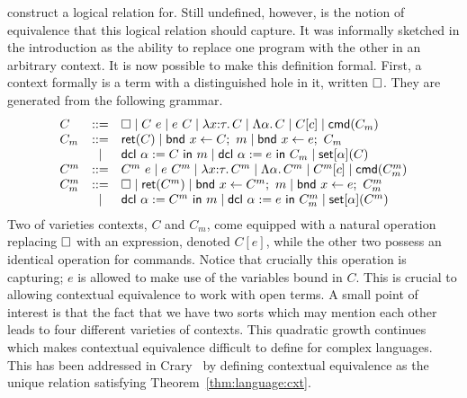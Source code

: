 construct a logical relation for. Still undefined, however, is the
notion of equivalence that this logical relation should capture. It
was informally sketched in the introduction as the ability to replace
one program with the other in an arbitrary context. It is now possible
to make this definition formal. First, a context formally is a term
with a distinguished hole in it, written $\square$. They are generated
from the following grammar.
\[
  \begin{array}{lcl}
    C &::=& \square \mid C\ e \mid e\ C \mid \lambda x {:} \tau.\, C \mid
            \Lambda \alpha.\, C \mid C[c] \mid \mathsf{cmd}(C_m)\\
    C_m &::=& \mathsf{ret}(C) \mid \mathsf{bnd}\ x \gets C;\ m \mid \mathsf{bnd}\ x \gets e;\ C_m\\
      & \mid & \mathsf{dcl}\ \alpha := C\ \mathsf{in}\ m \mid \mathsf{dcl}\ \alpha := e\ \mathsf{in}\ C_m \mid \mathsf{set}[\alpha](C)\\
    C^m &::=& C^m\ e \mid e\ C^m \mid \lambda x {:} \tau.\, C^m \mid
    \Lambda \alpha.\, C^m \mid C^m[c] \mid \mathsf{cmd}(C_m^m)\\
    C_m^m &::=& \square \mid \mathsf{ret}(C^m) \mid \mathsf{bnd}\ x \gets C^m;\ m \mid \mathsf{bnd}\ x \gets e;\ C_m^m\\
 & \mid & \mathsf{dcl}\ \alpha := C^m\ \mathsf{in}\ m \mid \mathsf{dcl}\ \alpha := e\ \mathsf{in}\ C_m^m \mid \mathsf{set}[\alpha](C^m)\\
  \end{array}
\]
Two of varieties contexts, $C$ and $C_m$, come equipped with a natural
operation replacing $\square$ with an expression, denoted $C[e]$, while
the other two possess an identical operation for commands. Notice that
crucially this operation is capturing; $e$ is allowed to make use of
the variables bound in $C$. This is crucial to allowing contextual
equivalence to work with open terms. A small point of interest is that
the fact that we have two sorts which may mention each other leads to
four different varieties of contexts. This quadratic growth continues
which makes contextual equivalence difficult to define for complex
languages. This has been addressed in Crary~\citep{TODO-MODULES} by
defining contextual equivalence as the unique relation satisfying
Theorem~\ref{thm:language:cxt}.

